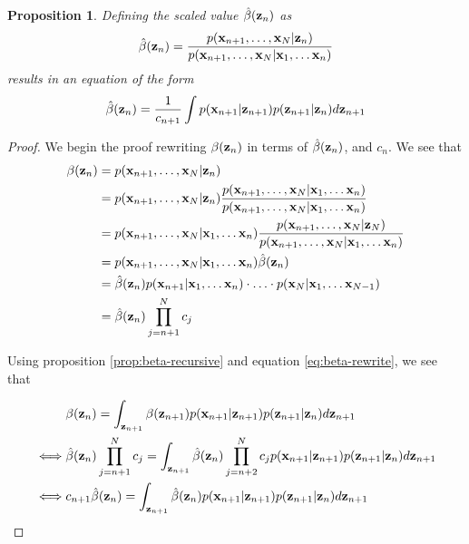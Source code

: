 \documentclass[11pt]{article}
\numberwithin{equation}{section}
\newcommand{\x}{{\bf x}}
\newcommand{\z}{{\bf z}}
\newtheorem{proposition}{Proposition}[section]
\begin{document}
\begin{proposition} \label{prop:beta-hat}
	Defining the scaled value $\hat\beta(\z_n)$ as
	\begin{equation}
		\hat\beta(\z_n) = \frac{p(\x_{n+1}, \ldots, \x_N \vert \z_n)}{p(\x_{n+1}, \ldots, \x_N \vert \x_1, \ldots \x_n)}
	\end{equation}
	results in an equation of the form
	\begin{equation}
		\hat\beta(\z_n) = \frac{1}{c_{n+1}}\int p(\x_{n+1}\vert\z_{n+1})p(\z_{n+1}\vert\z_n) d\z_{n+1} 
	\end{equation}
\end{proposition}

\begin{proof}
	We begin the proof rewriting $\beta(\z_n)$ in terms of $\hat\beta(\z_n)$, and $c_n$. We see that
	\begin{align}
		\beta(\z_n) &= p(\x_{n+1}, \ldots, \x_N \vert \z_n)\\
		&= p(\x_{n+1}, \ldots, \x_N \vert \z_n) \frac{p(\x_{n+1}, \ldots, \x_N \vert \x_1, \ldots \x_n)}{p(\x_{n+1}, \ldots, \x_N \vert \x_1, \ldots \x_n)} \\
		&= p(\x_{n+1}, \ldots, \x_N \vert \x_1, \ldots \x_n) \frac{p(\x_{n+1}, \ldots, \x_N \vert \z_N)}{p(\x_{n+1}, \ldots, \x_N \vert \x_1, \ldots \x_n)}\\
		&= p(\x_{n+1}, \ldots, \x_N \vert \x_1, \ldots \x_n) \hat\beta(\z_n)\\
		&= \hat\beta(\z_n) p(\x_{n+1} \vert \x_1, \ldots \x_n) \cdot \ldots \cdot p(\x_{N} \vert \x_1, \ldots \x_{N-1})\\
		&= \hat\beta(\z_n) \prod_{j=n+1}^N c_j \label{eq:beta-rewrite}
	\end{align}
	
	Using proposition \ref{prop:beta-recursive} and equation \eqref{eq:beta-rewrite}, we see that
	
	\begin{align}
		&\beta(\z_n) = \int_{\z_{n+1}} \beta(\z_{n+1})p(\x_{n+1}\vert \z_{n+1}) p(\z_{n+1}\vert \z_n) d\z_{n+1}\\
		\iff& \hat\beta(\z_n) \prod_{j=n+1}^N c_j = \int_{\z_{n+1}}\hat\beta(\z_n) \prod_{j=n+2}^N c_jp(\x_{n+1}\vert \z_{n+1}) p(\z_{n+1}\vert \z_n) d\z_{n+1}\\
		\iff& c_{n+1} \hat\beta(\z_n) = \int_{\z_{n+1}} \hat\beta(\z_n) p(\x_{n+1}\vert \z_{n+1}) p(\z_{n+1}\vert \z_n) d\z_{n+1}
	\end{align}
\end{proof}
\end{document}
